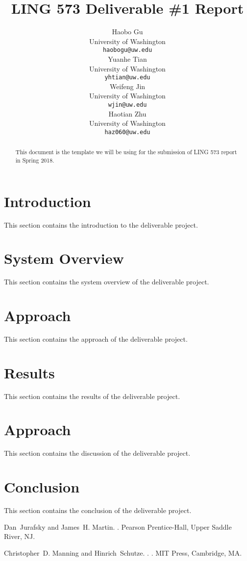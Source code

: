 \documentclass[11pt]{article}
\title{LING 573 Deliverable \#1 Report}
\author{Haobo Gu \\
  \small University of Washington \\
  {\tt haobogu@uw.edu} \\\And
 Yuanhe Tian \\
 \small University of Washington \\
  {\tt yhtian@uw.edu}\\\And
 Weifeng Jin \\
 \small University of Washington \\
  {\tt wjin@uw.edu} \\\And
 Haotian Zhu \\
 \small University of Washington \\
  {\tt haz060@uw.edu}\\}
\date{}
\begin{document}
\maketitle
\begin{abstract}
  This document is the template we will be using for the submission of LING 573 report in Spring 2018.
\end{abstract}

\section{Introduction}

This section contains the introduction to the deliverable project.

\section{System Overview}

This section contains the system overview of the deliverable project.

\section{Approach}

This section contains the approach of the deliverable project.

\section{Results}

This section contains the results of the deliverable project.

\section{Approach}

This section contains the discussion of the deliverable project.

\section{Conclusion}

This section contains the conclusion of the deliverable project.

\begin{thebibliography}{}

Dan~Jurafsky and James~H. Martin.
.
\newblock Pearson Prentice-{Hall}, Upper Saddle River, NJ.

{Christopher~D. Manning and Hinrich~Schutze}.
.
.
\newblock MIT Press, Cambridge, MA.

\end{thebibliography}
\end{document}

